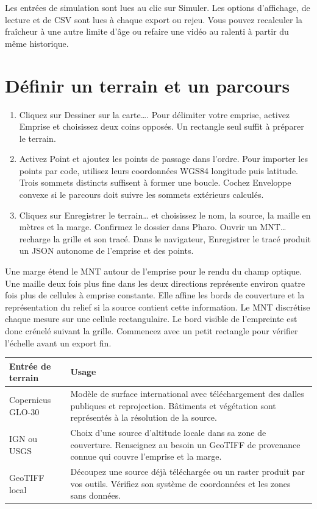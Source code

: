 \documentclass[11pt,a4paper]{article}
\newcommand{\ui}[1]{\textsf{#1}}
\begin{document}
Les entrées de simulation sont lues au clic sur \ui{Simuler}. Les options d'affichage, de lecture et de CSV sont lues à chaque export ou rejeu. Vous pouvez recalculer la fraîcheur à une autre limite d'âge ou refaire une vidéo au ralenti à partir du même historique.

\section{Définir un terrain et un parcours}
\begin{enumerate}
\item Cliquez sur \ui{Dessiner sur la carte…}. Pour délimiter votre emprise, activez \ui{Emprise} et choisissez deux coins opposés. Un rectangle seul suffit à préparer le terrain.
\item Activez \ui{Point} et ajoutez les points de passage dans l'ordre. Pour importer les points par code, utilisez leurs coordonnées WGS84 longitude puis latitude. Trois sommets distincts suffisent à former une boucle. Cochez \ui{Enveloppe convexe} si le parcours doit suivre les sommets extérieurs calculés.
\item Cliquez sur \ui{Enregistrer le terrain…} et choisissez le nom, la source, la maille en mètres et la marge. Confirmez le dossier dans Pharo. \ui{Ouvrir un MNT…} recharge la grille et son tracé. Dans le navigateur, \ui{Enregistrer le tracé} produit un JSON autonome de l'emprise et des points.
\end{enumerate}

Une marge étend le MNT autour de l'emprise pour le rendu du champ optique. Une maille deux fois plus fine dans les deux directions représente environ quatre fois plus de cellules à emprise constante. Elle affine les bords de couverture et la représentation du relief si la source contient cette information. Le MNT discrétise chaque mesure sur une cellule rectangulaire. Le bord visible de l'empreinte est donc crénelé suivant la grille. Commencez avec un petit rectangle pour vérifier l'échelle avant un export fin.

\begin{tabularx}{\linewidth}{@{}lY@{}}
\toprule
Entrée de terrain & Usage \\
\midrule
Copernicus GLO-30 & Modèle de surface international avec téléchargement des dalles publiques et reprojection. Bâtiments et végétation sont représentés à la résolution de la source. \\
IGN ou USGS & Choix d'une source d'altitude locale dans sa zone de couverture. Renseignez au besoin un GeoTIFF de provenance connue qui couvre l'emprise et la marge. \\
GeoTIFF local & Découpez une source déjà téléchargée ou un raster produit par vos outils. Vérifiez son système de coordonnées et les zones sans données. \\
\bottomrule
\end{tabularx}
\end{document}
